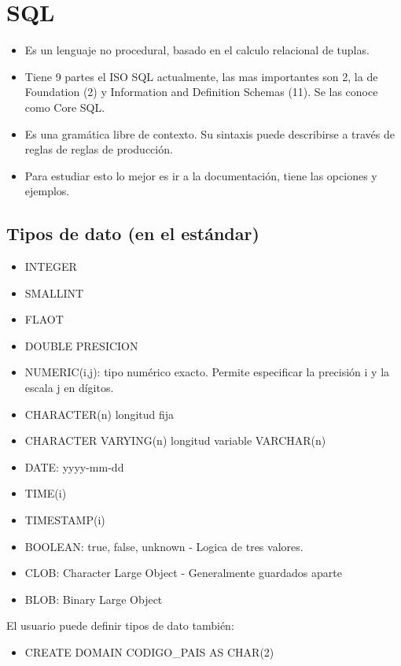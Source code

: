 \section{SQL}

\begin{itemize}
\item Es un lenguaje no procedural, basado en el calculo relacional de tuplas.
\item Tiene 9 partes el ISO SQL actualmente, las mas importantes son 2, la de Foundation (2) y Information and Definition Schemas (11). Se las conoce como Core SQL.
\item Es una gramática libre de contexto. Su sintaxis puede describirse a través de reglas de reglas de producción.
\item Para estudiar esto lo mejor es ir a la documentación, tiene las opciones y ejemplos.
\end{itemize}


\subsection*{Tipos de dato (en el estándar)}
\begin{itemize}
\item INTEGER
\item SMALLINT
\item FLAOT
\item DOUBLE PRESICION
\item NUMERIC(i,j): tipo numérico exacto. Permite especificar la precisión i y la escala j en dígitos.
\item CHARACTER(n) longitud fija
\item CHARACTER VARYING(n) longitud variable VARCHAR(n)
\item DATE: yyyy-mm-dd
\item TIME(i)
\item TIMESTAMP(i)
\item BOOLEAN: true, false, unknown - Logica de tres valores.
\item CLOB: Character Large Object - Generalmente guardados aparte 
\item BLOB: Binary Large Object
\end{itemize}


El usuario puede definir tipos de dato también:
\begin{itemize}
\item CREATE DOMAIN CODIGO\_PAIS AS CHAR(2)
\end{itemize}


